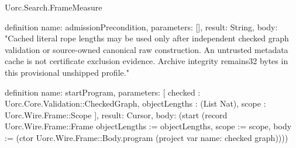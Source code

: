 \begin{lexlean}{Uorc.Search.FrameMeasure}
\begin{semanticmodule}
definition{
  name: admissionPrecondition,
  parameters: [],
  result: String,
  body: "Cached literal rope lengths may be used only after independent checked graph validation or source-owned canonical raw construction. An untrusted metadata cache is not certificate exclusion evidence. Archive integrity remains32 bytes in this provisional unshipped profile."
}

definition{
  name: startProgram,
  parameters: [
    checked : Uorc.Core.Validation::CheckedGraph,
    objectLengths : (List Nat),
    scope : Uorc.Wire.Frame::Scope
  ],
  result: Cursor,
  body: (start (record Uorc.Wire.Frame::Frame {objectLengths := objectLengths, scope := scope, body := (ctor Uorc.Wire.Frame::Body.program (project var{
    name: checked
  } graph))}))
}
\end{semanticmodule}
\end{lexlean}
